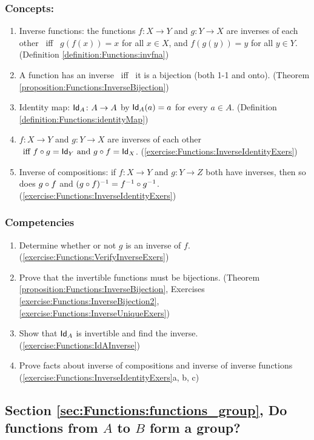 \subsubsection*{Concepts:}
\begin{enumerate}
\item 
Inverse functions: the functions $f \colon X \to Y$  and $g \colon Y \to X$ are inverses of each other \mbox{ iff } $g(f(x)) = x$ for all $x \in X$, and $f(g(y)) = y$ for all $y \in Y$. (Definition \ref{definition:Functions:invfna})
\item
A function has an inverse \mbox{ iff } it is a bijection (both 1-1 and onto). (Theorem \ref{proposition:Functions:InverseBijection})
\item
Identity map: ${\sf Id}_{A} \colon A \to A$ by ${\sf Id}_{A}(a) = a$ for every $a \in A$. (Definition \ref{definition:Functions:identityMap})
\item
$f \colon X \to Y$ and $g \colon Y \to X$ are inverses of each other  $\mbox{ iff } f \circ g = {\sf Id}_{Y} \text{  and  }g \circ f = {\sf Id}_{X}$. (\ref{exercise:Functions:InverseIdentityExers})
\item
Inverse of compositions: if $f \colon X \to Y$ and $g \colon Y \to Z$ both have inverses, then so does $g \circ f$  and 
$(g \circ f)^{-1} = f^{-1} \circ g^{-1}$. (\ref{exercise:Functions:InverseIdentityExers})
\end{enumerate}

\subsubsection*{Competencies}
\begin{enumerate}
\item
Determine whether or not $g$ is an inverse of $f$. (\ref{exercise:Functions:VerifyInverseExers})
\item
Prove that the invertible functions must be bijections. (Theorem \ref{proposition:Functions:InverseBijection}, Exercises \ref{exercise:Functions:InverseBijection2}, \ref{exercise:Functions:InverseUniqueExers})
\item
Show that ${\sf Id}_{A}$ is invertible and find the inverse. (\ref{exercise:Functions:IdAInverse})
\item
Prove facts about inverse of compositions and inverse of inverse functions (\ref{exercise:Functions:InverseIdentityExers}a, b, c)
\end{enumerate}


\subsection*{Section \ref{sec:Functions:functions_group}, Do functions from $A$ to $B$ form a group?}
